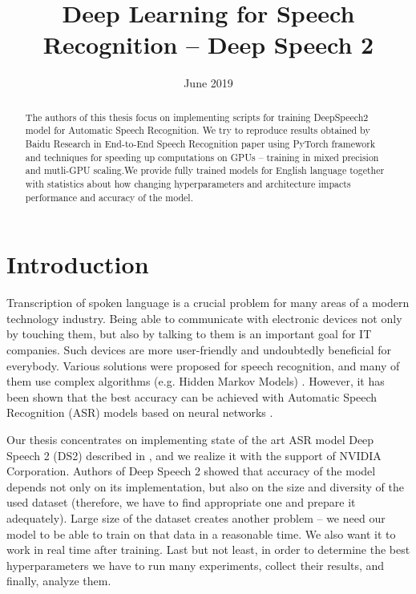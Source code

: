 \documentclass[licencjacka,en]{pracamgr}
\title{Deep Learning for Speech Recognition -- Deep Speech 2}
\date{June 2019}
\begin{document}
	\maketitle
	
	\begin{abstract}
		The authors of this thesis focus on implementing scripts for training DeepSpeech2 model for Automatic Speech Recognition. We try to reproduce results obtained by Baidu Research in End-to-End Speech Recognition paper \cite{DS2} using PyTorch framework and techniques for speeding up computations on GPUs -- training in mixed precision and mutli-GPU scaling.We provide fully trained models for English language together with statistics about how changing hyperparameters and architecture impacts performance and accuracy of the model.
	\end{abstract}
	
	\tableofcontents
	
	\chapter*{Introduction}
	Transcription of spoken language is a crucial problem for many areas of a modern technology industry. Being able to communicate with electronic devices not only by touching them, but also by talking to them is an important goal for IT companies. Such devices are more user-friendly and undoubtedly beneficial for everybody. Various solutions were proposed for speech recognition, and many of them use complex algorithms (e.g. Hidden Markov Models) \cite{DS1}. However, it has been shown that the best accuracy can be achieved with Automatic Speech Recognition (ASR) models based on neural networks \cite{DS2}.
	
	Our thesis concentrates on implementing state of the art ASR model Deep Speech 2 (DS2) described in \cite{DS2}, and we realize it with the support of NVIDIA Corporation. Authors of Deep Speech 2 showed that accuracy of the model depends not only on its implementation, but also on the size and diversity of the used dataset (therefore, we have to find appropriate one and prepare it adequately). Large size of the dataset creates another problem -- we need our model to be able to train on that data in a reasonable time. We also want it to work in real time after training. Last but not least, in order to determine the best hyperparameters we have to run many experiments, collect their results, and finally, analyze them.
	
\end{document}
